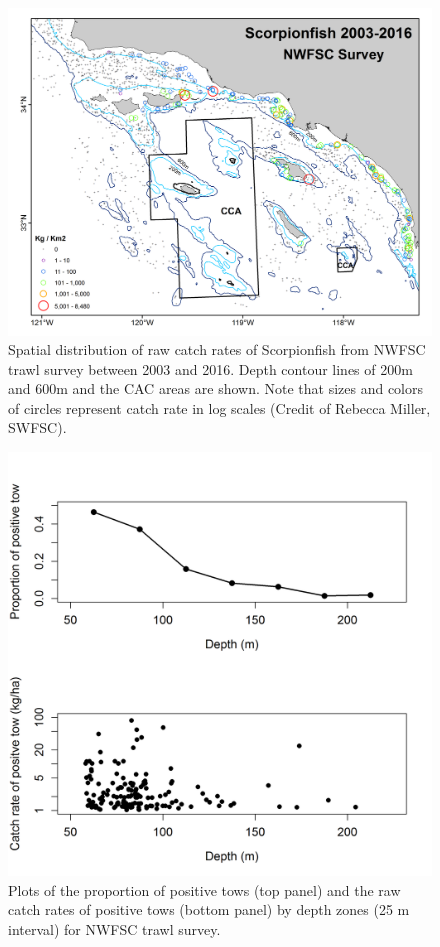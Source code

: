 \documentclass[12pt,]{article}
\begin{document}
\FloatBarrier

\begin{figure}[htbp]
\centering
\includegraphics{Figures/NWFSCtrawl_map.png}
\caption{Spatial distribution of raw catch rates of Scorpionfish from
NWFSC trawl survey between 2003 and 2016. Depth contour lines of 200m
and 600m and the CAC areas are shown. Note that sizes and colors of
circles represent catch rate in log scales (Credit of Rebecca Miller,
SWFSC). \label{fig:Fleet8_NWFSCtrawl_map}}
\end{figure}

\begin{figure}[htbp]
\centering
\includegraphics{Figures/NWFSCtrawl_posdepth.png}
\caption{Plots of the proportion of positive tows (top panel) and the
raw catch rates of positive tows (bottom panel) by depth zones (25 m
interval) for NWFSC trawl survey.
\label{fig:Fleet8_NWFSCtrawl_posdepth}}
\end{figure}
\end{document}
